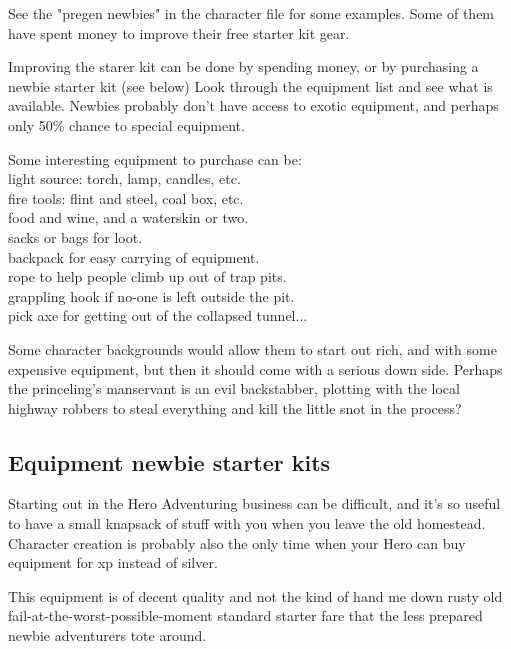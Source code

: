 See the "pregen newbies" in the character file for some examples. Some of them have spent money to improve their free starter kit gear.


Improving the starer kit can be done by spending money, or by purchasing a newbie starter kit (see below) Look through the equipment list and see what is available. Newbies probably don't have access to exotic equipment, and perhaps only 50\% chance to special equipment.

Some interesting equipment to purchase can be: \\
light source: torch, lamp, candles, etc. \\
fire tools: flint and steel, coal box, etc. \\
food and wine, and a waterskin or two. \\
sacks or bags for loot. \\
backpack for easy carrying of equipment. \\
rope to help people climb up out of trap pits. \\
grappling hook if no-one is left outside the pit. \\
pick axe for getting out of the collapsed tunnel...

Some character backgrounds would allow them to start out rich, and with some expensive equipment, but then it should come with a serious down side. Perhaps the princeling's manservant is an evil backstabber, plotting with the local highway robbers to steal everything and kill the little snot in the process?


\subsection*{Equipment newbie starter kits}
Starting out in the Hero Adventuring business can be difficult, and it's so useful to have a small knapsack of stuff with you when you leave the old homestead. Character creation is probably also the only time when your Hero can buy equipment for xp instead of silver.

This equipment is of decent quality and not the kind of hand me down rusty old fail-at-the-worst-possible-moment standard starter fare that the less prepared newbie adventurers tote around.

\

